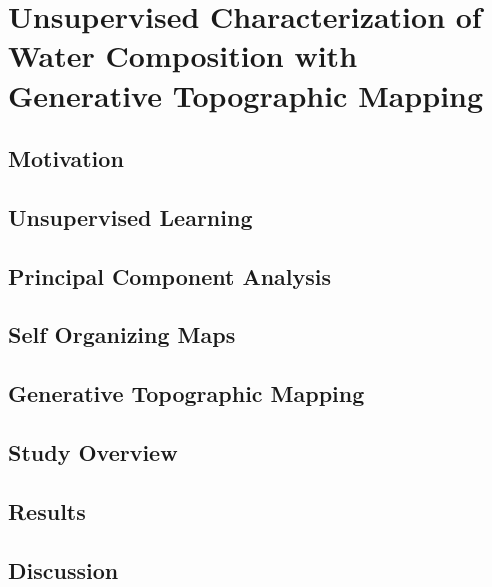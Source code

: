 \chapter{Unsupervised Characterization of Water Composition with Generative Topographic Mapping}\label{ch:robot-team-gtm}


\section{Motivation}

\section{Unsupervised Learning}

\section{Principal Component Analysis}

\section{Self Organizing Maps}

\section{Generative Topographic Mapping}

\section{Study Overview}

\section{Results}

\section{Discussion}
